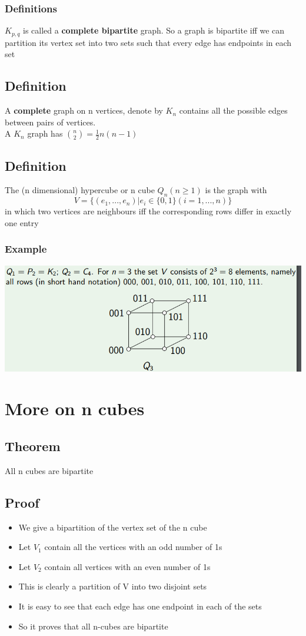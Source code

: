 \documentclass{article}[18pt]
\begin{document}
\subsubsection{Definitions}
$K_{p,q}$ is called a \textbf{complete bipartite} graph. So a graph is bipartite iff we can partition its vertex set into two sets such that every edge has endpoints in each set
\subsection{Definition}
A \textbf{complete} graph on n vertices, denote by $K_n$ contains all the possible edges between pairs of vertices.\\
A $K_n$ graph has $\binom{n}{2}=\frac{1}{2}n(n-1)$
\subsection{Definition}
The (n dimensional) hypercube or n cube $Q_n (n\geqslant 1)$ is the graph with
$$V=\{(e_1,...,e_n)|e_i\in\{0,1\} (i=1,...,n) \}$$
in which two vertices are neighbours iff the corresponding rows differ in exactly one entry
\subsubsection{Example}
\includegraphics[scale=0.7]{n_dimension}
\section{More on n cubes}
\subsection{Theorem}
All n cubes are bipartite
\subsection{Proof}
\begin{itemize}
	\item We give a bipartition of the vertex set of the n cube
	\item Let $V_1$ contain all the vertices with an odd number of 1s
	\item Let $V_2$ contain all vertices with an even number of 1s
	\item This is clearly a partition of V into two disjoint sets
	\item It is easy to see that each edge has one endpoint in each of the sets
	\item So it proves that all n-cubes are bipartite
\end{itemize}
\end{document}

